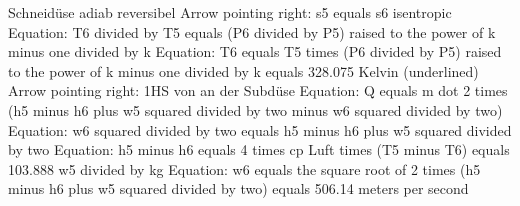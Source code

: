 Schneidüse adiab reversibel
Arrow pointing right: s5 equals s6 isentropic
Equation: T6 divided by T5 equals (P6 divided by P5) raised to the power of k minus one divided by k
Equation: T6 equals T5 times (P6 divided by P5) raised to the power of k minus one divided by k equals 328.075 Kelvin (underlined)
Arrow pointing right: 1HS von an der Subdüse
Equation: Q equals m dot 2 times (h5 minus h6 plus w5 squared divided by two minus w6 squared divided by two)
Equation: w6 squared divided by two equals h5 minus h6 plus w5 squared divided by two
Equation: h5 minus h6 equals 4 times cp Luft times (T5 minus T6) equals 103.888 w5 divided by kg
Equation: w6 equals the square root of 2 times (h5 minus h6 plus w5 squared divided by two) equals 506.14 meters per second